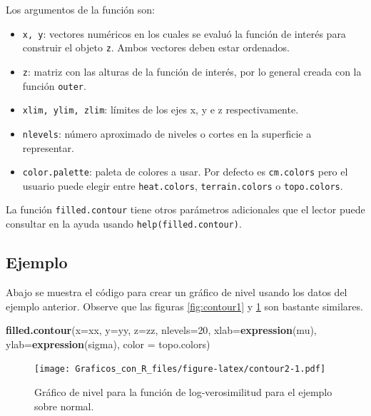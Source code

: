 \documentclass[10pt,]{krantz}
\makeatletter
\newenvironment{Shaded}{\begin{snugshade}}{\end{snugshade}}
\newcommand{\KeywordTok}[1]{\textcolor[rgb]{0.13,0.29,0.53}{\textbf{#1}}}
\newcommand{\DataTypeTok}[1]{\textcolor[rgb]{0.13,0.29,0.53}{#1}}
\newcommand{\DecValTok}[1]{\textcolor[rgb]{0.00,0.00,0.81}{#1}}
\newcommand{\NormalTok}[1]{#1}
\providecommand{\tightlist}{%
  \setlength{\itemsep}{0pt}\setlength{\parskip}{0pt}}
\newenvironment{kframe}{%
\medskip{}
\setlength{\fboxsep}{.8em}
 \def\at@end@of@kframe{}%
 \ifinner\ifhmode%
  \def\at@end@of@kframe{\end{minipage}}%
  \begin{minipage}{\columnwidth}%
 \fi\fi%
 \def\FrameCommand##1{\hskip\@totalleftmargin \hskip-\fboxsep
 \colorbox{shadecolor}{##1}\hskip-\fboxsep
     \hskip-\linewidth \hskip-\@totalleftmargin \hskip\columnwidth}%
 \MakeFramed {\advance\hsize-\width
   \@totalleftmargin\z@ \linewidth\hsize
   \@setminipage}}%
 {\par\unskip\endMakeFramed%
 \at@end@of@kframe}
\renewenvironment{Shaded}{\begin{kframe}}{\end{kframe}}
\makeatother
\begin{document}
Los argumentos de la función son:

\begin{itemize}
\tightlist
\item
  \texttt{x,\ y}: vectores numéricos en los cuales se evaluó la función
  de interés para construir el objeto \texttt{z}. Ambos vectores deben
  estar ordenados.
\item
  \texttt{z}: matriz con las alturas de la función de interés, por lo
  general creada con la función \texttt{outer}.
\item
  \texttt{xlim,\ ylim,\ zlim}: límites de los ejes x, y e z
  respectivamente.
\item
  \texttt{nlevels}: número aproximado de niveles o cortes en la
  superficie a representar.
\item
  \texttt{color.palette}: paleta de colores a usar. Por defecto es
  \texttt{cm.colors} pero el usuario puede elegir entre
  \texttt{heat.colors}, \texttt{terrain.colors} o \texttt{topo.colors}.
\end{itemize}

La función \texttt{filled.contour} tiene otros parámetros adicionales
que el lector puede consultar en la ayuda usando
\texttt{help(filled.contour)}.

\subsection*{Ejemplo}\label{ejemplo-22}


Abajo se muestra el código para crear un gráfico de nivel usando los
datos del ejemplo anterior. Observe que las figuras \ref{fig:contour1} y
\ref{fig:contour2} son bastante similares.

\begin{Shaded}
\begin{Highlighting}[]
\KeywordTok{filled.contour}\NormalTok{(}\DataTypeTok{x=}\NormalTok{xx, }\DataTypeTok{y=}\NormalTok{yy, }\DataTypeTok{z=}\NormalTok{zz, }\DataTypeTok{nlevels=}\DecValTok{20}\NormalTok{,}
               \DataTypeTok{xlab=}\KeywordTok{expression}\NormalTok{(mu), }\DataTypeTok{ylab=}\KeywordTok{expression}\NormalTok{(sigma),}
               \DataTypeTok{color =}\NormalTok{ topo.colors)}
\end{Highlighting}
\end{Shaded}

\begin{figure}
\centering
\texttt{[image: Graficos\_con\_R\_files/figure-latex/contour2-1.pdf]}
\caption{\label{fig:contour2}Gráfico de nivel para la función de
log-verosimilitud para el ejemplo sobre normal.}
\end{figure}
\end{document}

